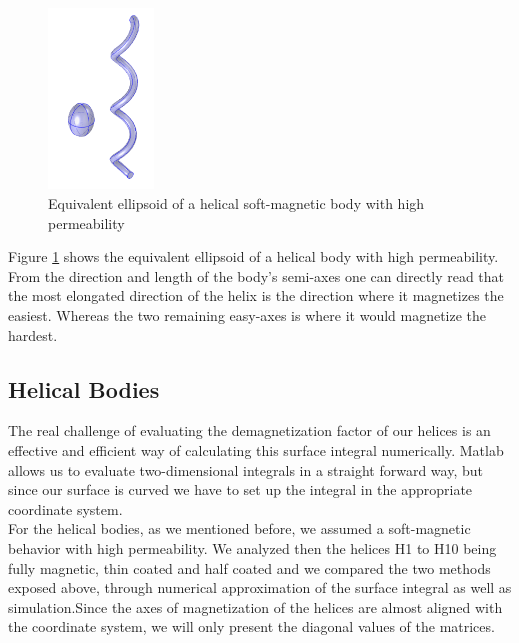 \begin{figure}[ht]
	\centering
  \includegraphics[width=0.25\textwidth]{Pictures/eqell.png}
	\caption{Equivalent ellipsoid of a helical soft-magnetic body with high permeability}
	\label{fig:eqell}
\end{figure}

Figure \ref{fig:eqell} shows the equivalent ellipsoid of a helical body with high permeability. From the direction and length of the body's semi-axes one can directly read that the most elongated  direction of the helix is the direction where it magnetizes the easiest. Whereas the two remaining easy-axes is where it would magnetize the hardest.


\subsection{Helical Bodies}

The real challenge of evaluating the demagnetization factor of our helices is an effective and efficient way of calculating this surface integral numerically. Matlab allows us to evaluate two-dimensional integrals in a straight forward way, but since our surface is curved we have to set up the integral in the appropriate coordinate system. \\


For the helical bodies, as we mentioned before, we assumed a soft-magnetic behavior with high permeability. We analyzed then the helices H1 to H10 being fully magnetic, thin coated and half coated and we compared the two methods exposed above, through numerical approximation of the surface integral as well as simulation.Since the axes of magnetization of the helices are almost aligned with the coordinate system, we will only present the diagonal values of the matrices.\\

